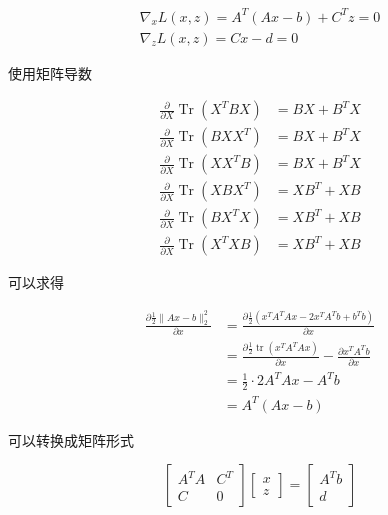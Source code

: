\begin{equation}
    \label{eqn:kkt-deriavative}
    \begin{array}{l}
\nabla_{x} L(x, z)=A^{T}(A x-b)+C^{T} z=0 \\
\nabla_{z} L(x, z)=C x-d=0
\end{array}
\end{equation}



\begin{remark}
    使用矩阵导数

    \begin{equation} \begin{aligned} \frac{\partial}{\partial {X}} \operatorname{Tr}\left({X}^{T} {B X}\right) &={B X}+{B}^{T} {X} \\ \frac{\partial}{\partial {X}} \operatorname{Tr}\left({B X X}^{T}\right) &={B X}+{B}^{T} {X} \\ \frac{\partial}{\partial {X}} \operatorname{Tr}\left({X X}^{T} {B}\right) &={B X}+{B}^{T} {X} \\ \frac{\partial}{\partial {X}} \operatorname{Tr}\left({X B X}^{T}\right) &={X B}^{T}+{X B} \\ \frac{\partial}{\partial {X}} \operatorname{Tr}\left({B X}^{T} {X}\right) &={X B}^{T}+{X B} \\ \frac{\partial}{\partial {X}} \operatorname{Tr}\left({X}^{T} {X B}\right) &={X B}^{T}+{X B} \end{aligned} \end{equation}

    可以求得

    \begin{equation}\begin{aligned}
        \frac{\partial \frac{1}{2} \| Ax-b\| _{2}^{2}}{\partial x} & =\frac{\partial \frac{1}{2}\left( x^{T} A^{T} Ax-2x^{T} A^{T} b+b^{T} b\right)}{\partial x}\\
         & =\frac{\partial \frac{1}{2}\operatorname{tr}\left( x^{T} A^{T} Ax\right)}{\partial x} -\frac{\partial x^{T} A^{T} b}{\partial x}\\
         & =\frac{1}{2} \cdotp 2A^{T} Ax-A^{T} b\\
         & =A^{T}( Ax-b)
        \end{aligned}\end{equation}
\end{remark}

可以转换成矩阵形式

\begin{equation} \left[\begin{array}{cc}A^{T} A & C^{T} \\ {C} & 0\end{array}\right]\left[\begin{array}{l}x \\ z\end{array}\right]=\left[\begin{array}{l}A^{T} b \\ d\end{array}\right] \end{equation}

